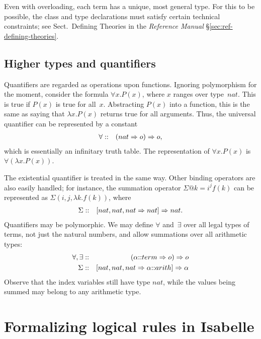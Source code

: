 Even with overloading, each term has a unique, most general type. For this
to be possible, the class and type declarations must satisfy certain
technical constraints; see
%
{Sect.\ Defining Theories in the {\em Reference Manual}}%
{\S\ref{sec:ref-defining-theories}}.

\subsection{Higher types and quantifiers}
Quantifiers are regarded as operations upon functions. Ignoring polymorphism
for the moment, consider the formula $\forall x. P(x)$, where $x$ ranges
over type~$nat$. This is true if $P(x)$ is true for all~$x$. Abstracting
$P(x)$ into a function, this is the same as saying that $\lambda x.P(x)$
returns true for all arguments. Thus, the universal quantifier can be
represented by a constant
\begin{eqnarray*}
    \forall  & :: & (nat\Rightarrow o) \Rightarrow o,
\end{eqnarray*}
which is essentially an infinitary truth table. The representation of $\forall
x. P(x)$ is $\forall(\lambda x. P(x))$.

The existential quantifier is treated
in the same way. Other binding operators are also easily handled; for
instance, the summation operator $\Sigma@{k=i}^j f(k)$ can be represented as
$\Sigma(i,j,\lambda k.f(k))$, where
\begin{eqnarray*}
    \Sigma  & :: & [nat,nat, nat\Rightarrow nat] \Rightarrow nat.
\end{eqnarray*}
Quantifiers may be polymorphic. We may define $\forall$ and~$\exists$ over
all legal types of terms, not just the natural numbers, and
allow summations over all arithmetic types:
\begin{eqnarray*}
    \forall,\exists      & :: & (\alpha{::}term\Rightarrow o) \Rightarrow o \\
    \Sigma               & :: & [nat,nat, nat\Rightarrow \alpha{::}arith] \Rightarrow \alpha
\end{eqnarray*}
Observe that the index variables still have type $nat$, while the values
being summed may belong to any arithmetic type.


\section{Formalizing logical rules in Isabelle}

